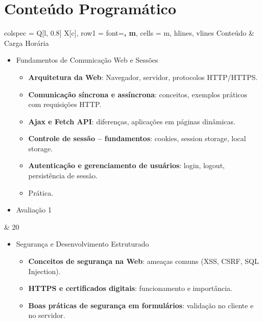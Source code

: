 \documentclass[a4paper, 12pt]{article}
\begin{document}
\section{Conteúdo Programático}

\begin{longtblr}{colspec = {Q[l, 0.8\textwidth] X[c]},
        row{1} = {font=\bfseries, m},
        cells = {m},
        hlines, vlines
        }
    Conteúdo & Carga Horária\\
    \begin{itemize}
        \item Fundamentos de Comunicação Web e Sessões
            \begin{itemize}
                \item \textbf{Arquitetura da Web}: Navegador, servidor, protocolos HTTP/HTTPS.
                \item \textbf{Comunicação síncrona e assíncrona}: conceitos, exemplos práticos com requisições HTTP.
                \item \textbf{Ajax e Fetch API}: diferenças, aplicações em páginas dinâmicas.
                \item \textbf{Controle de sessão – fundamentos}: cookies, session storage, local storage.
                \item \textbf{Autenticação e gerenciamento de usuários}: login, logout, persistência de sessão.
                \item Prática.
            \end{itemize}
        \item Avaliação 1
    \end{itemize} & 20\\
    \begin{itemize}
        \item Segurança e Desenvolvimento Estruturado
            \begin{itemize}
                \item \textbf{Conceitos de segurança na Web}: ameaças comuns (XSS, CSRF, SQL Injection).
                \item \textbf{HTTPS e certificados digitais}: funcionamento e importância.
                \item \textbf{Boas práticas de segurança em formulários}: validação no cliente e no servidor.

\end{itemize}
\end{itemize}
\end{longtblr}
\end{document}
